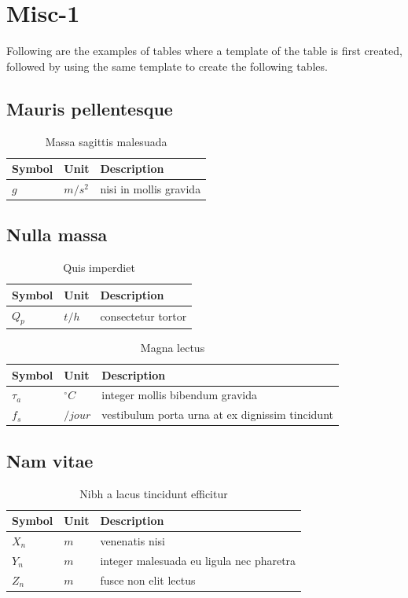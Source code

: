 \section{Misc-1}
Following are the examples of tables where a template of the table is first created, followed by using the same template to create the following tables.

\newenvironment{nomenclature}[1]
{
\begin{table}[hbt]
\caption{#1}
\begin{center}
\begin{tabular}{|l|l|l|}
\hline
\textbf{Symbol} & \textbf{Unit} & \textbf{Description}\\
\hline
}
{
\\\hline
\end{tabular}
\end{center}
\end{table}
}

\subsection{Mauris pellentesque}

\begin{nomenclature}{Massa sagittis malesuada}
$g$     & $m/s^{2}$ & nisi in mollis gravida
\end{nomenclature}

\subsection{Nulla massa}

\begin{nomenclature}{Quis imperdiet}
$Q_{p}$         & $t/h$             & consectetur tortor
\end{nomenclature}

\begin{nomenclature}{Magna lectus}
$\tau_{a}$    	& $^{\circ}C$       & integer mollis bibendum gravida\\
$f_{s}$     	& $/jour$           & vestibulum porta urna at ex dignissim tincidunt
\end{nomenclature}

\subsection{Nam vitae}

\begin{nomenclature}{Nibh a lacus tincidunt efficitur}
$X_n$   & $m$               & venenatis nisi\\
$Y_n$   & $m$               & integer malesuada eu ligula nec pharetra\\
$Z_n$   & $m$               & fusce non elit lectus
\end{nomenclature}
